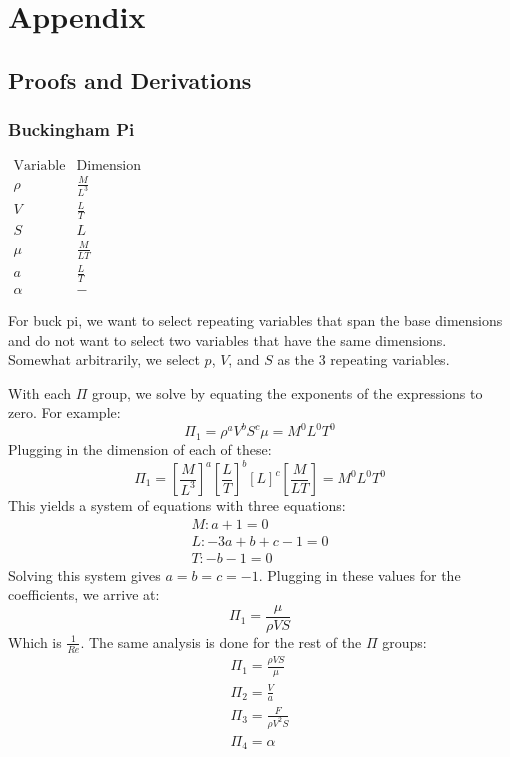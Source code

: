 \documentclass[12pt]{report}
\begin{document}
\chapter{Appendix}

\section{Proofs and Derivations}\label{sec:ProofsAndDerivations}
\subsection{Buckingham Pi}\label{Buckingham Pi Deriv}

\begin{center}
$\begin{array}{ccc}
     \text{Variable} & \text{Dimension}
     &  \\ \rho & \frac{M}{L^3}
     &  \\ V    & \frac{L}{T}
     &  \\ S    & L
     &  \\\mu &  \frac{M}{LT}
     &  \\a & \frac{L}{T}
     & \\\alpha & -
\end{array}$
\end{center}

For \gls{buck pi}, we want to select repeating variables that span the base dimensions and do not want to select two variables that have the same dimensions. Somewhat arbitrarily, we select $p$, $V$, and $S$ as the 3 repeating variables.

With each $\Pi$ group, we solve by equating the exponents of the expressions to zero. For example:
$$\Pi_1=\rho^aV^bS^c\mu=M^0L^0T^0$$
Plugging in the dimension of each of these:
$$\Pi_1=\left[\frac{M}{L^3}\right]^a\left[\frac{L}{T}\right]^b[L]^c\left[\frac{M}{LT}\right]=M^0L^0T^0$$
This yields a system of equations with three equations:
\begin{gather}
    M:a+1=0\\L:-3a+b+c-1=0\\T:-b-1=0
\end{gather}
Solving this system gives $a=b=c=-1$. Plugging in these values for the coefficients, we arrive at:
$$\Pi_1=\frac{\mu}{\rho VS}$$
Which is $\frac{1}{Re}$.  The same analysis is done for the rest of the $\Pi$ groups:
\begin{gather}
    \Pi_1=\frac{\rho VS}{\mu}\\
    \Pi_2=\frac{V}{a}\\
    \Pi_3=\frac{F}{\rho V^2S}\\
    \Pi_4=\alpha
\end{gather}
\end{document}

